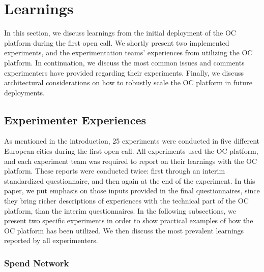 
\section{Learnings}
\label{sec:lear}

In this section, we discuss learnings from the initial deployment of the OC platform during the first open call. We shortly present two implemented experiments, and the experimentation teams' experiences from utilizing the OC platform. In continuation, we discuss the most common issues and comments experimenters have provided regarding their experiments. Finally, we discuss architectural considerations on how to robustly scale the OC platform in future deployments.

\subsection{Experimenter Experiences}

As mentioned in the introduction, 25 experiments were conducted in five different European cities during the first open call. All experiments used the OC platform, and each experiment team was required to report on their learnings with the OC platform. These reports were conducted twice: first through an interim standardized questionnaire, and then again at the end of the experiment. In this paper, we put emphasis on those inputs provided in the final questionnaires, since they bring richer descriptions of experiences with the technical part of the OC platform, than the interim questionnaires. In the following subsections, we present two specific experiments in order to show practical examples of how the OC platform has been utilized. We then discuss the most prevalent learnings reported by all experimenters.

\subsubsection{Spend Network}


